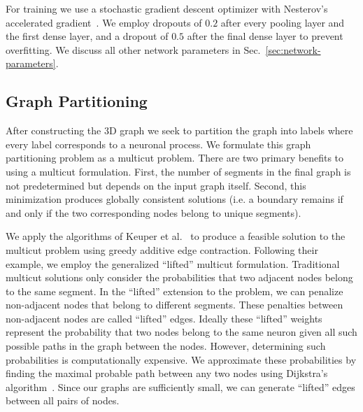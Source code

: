 For training we use a stochastic gradient descent optimizer with Nesterov's accelerated gradient~\cite{nesterov1983method}. 
We employ dropouts of $0.2$ after every pooling layer and the first dense layer, and a dropout of $0.5$ after the final dense layer to prevent overfitting. 
We discuss all other network parameters in Sec.~\ref{sec:network-parameters}.

\subsection{Graph Partitioning}

After constructing the 3D graph we seek to partition the graph into labels where every label corresponds to a neuronal process. 
We formulate this graph partitioning problem as a multicut problem.
There are two primary benefits to using a multicut formulation. 
First, the number of segments in the final graph is not predetermined but depends on the input graph itself. 
Second, this minimization produces globally consistent solutions (i.e. a boundary remains if and only if the two corresponding nodes belong to unique segments).

We apply the algorithms of Keuper et al.~\cite{keuper2015efficient} to produce a feasible solution to the multicut problem using greedy additive edge contraction.
Following their example, we employ the generalized ``lifted'' multicut formulation.
Traditional multicut solutions only consider the probabilities that two adjacent nodes belong to the same segment. 
In the ``lifted'' extension to the problem, we can penalize non-adjacent nodes that belong to different segments. 
These penalties between non-adjacent nodes are called ``lifted'' edges. 
Ideally these ``lifted'' weights represent the probability that two nodes belong to the same neuron given all such possible paths in the graph between the nodes.
However, determining such probabilities is computationally expensive.
We approximate these probabilities by finding the maximal probable path between any two nodes using Dijkstra's algorithm~\cite{keuper2015efficient}.
Since our graphs are sufficiently small, we can generate ``lifted'' edges between all pairs of nodes. 